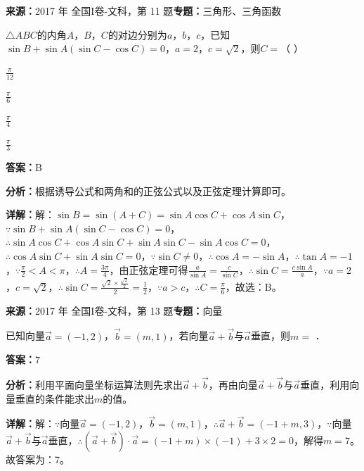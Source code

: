 \begin{question}[points=5]
\textbf{来源：}2017 年 全国I卷-文科，第 11 题\quad \textbf{专题：}三角形、三角函数\par
$\triangle ABC$的内角$A$，$B$，$C$的对边分别为$a$，$b$，$c$，已知$\sin B+\sin A(\sin C-\cos C)=0$，$a=2$，$c=\sqrt{2}$，则$C=$（    ）
\begin{choices}
  \item $\frac{\pi}{12}$
  \item $\frac{\pi}{6}$
  \item $\frac{\pi}{4}$
  \item $\frac{\pi}{3}$
\end{choices}
\begin{solution}
\textbf{答案：}B

\textbf{分析：}根据诱导公式和两角和的正弦公式以及正弦定理计算即可。

\textbf{详解：}解：$\sin B=\sin(A+C)=\sin A\cos C+\cos A\sin C$，$\because\sin B+\sin A(\sin C-\cos C)=0$，$\therefore\sin A\cos C+\cos A\sin C+\sin A\sin C-\sin A\cos C=0$，$\therefore\cos A\sin C+\sin A\sin C=0$，$\because\sin C\neq 0$，$\therefore\cos A=-\sin A$，$\therefore\tan A=-1$，$\because\frac{\pi}{2}<A<\pi$，$\therefore A=\frac{3\pi}{4}$，由正弦定理可得$\frac{a}{\sin A}=\frac{c}{\sin C}$，$\therefore\sin C=\frac{c\sin A}{a}$，$\because a=2$，$c=\sqrt{2}$，$\therefore\sin C=\frac{\sqrt{2}\times\frac{\sqrt{2}}{2}}{2}=\frac{1}{2}$，$\because a>c$，$\therefore C=\frac{\pi}{6}$，故选：B。
\end{solution}
\end{question}

\begin{question}[points=5]
\textbf{来源：}2017 年 全国I卷-文科，第 13 题\quad \textbf{专题：}向量\par
已知向量$\vec{a}=(-1,2)$，$\vec{b}=(m,1)$，若向量$\vec{a}+\vec{b}$与$\vec{a}$垂直，则$m=$ ．
\fillin[{$7$}]
\begin{solution}
\textbf{答案：}$7$

\textbf{分析：}利用平面向量坐标运算法则先求出$\vec{a}+\vec{b}$，再由向量$\vec{a}+\vec{b}$与$\vec{a}$垂直，利用向量垂直的条件能求出$m$的值。

\textbf{详解：}解：$\because$向量$\vec{a}=(-1,2)$，$\vec{b}=(m,1)$，$\therefore\vec{a}+\vec{b}=(-1+m,3)$，$\because$向量$\vec{a}+\vec{b}$与$\vec{a}$垂直，$\therefore(\vec{a}+\vec{b})\cdot\vec{a}=(-1+m)\times(-1)+3\times2=0$，解得$m=7$。故答案为：7。
\end{solution}
\end{question}

